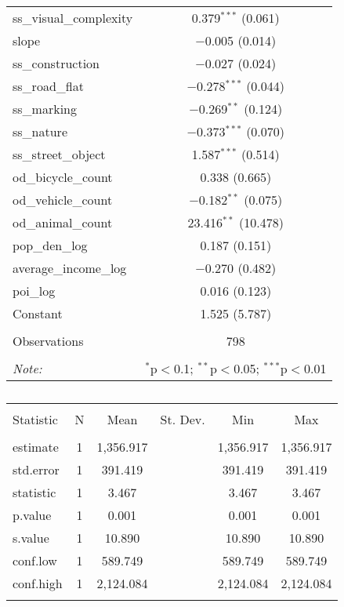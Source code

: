 \begin{table}[!htbp]
\begin{tabular}{@{\extracolsep{1pt}}lc}
  ss\_visual\_complexity & 0.379$^{***}$ (0.061) \\ 
  slope & $-$0.005 (0.014) \\ 
  ss\_construction & $-$0.027 (0.024) \\ 
  ss\_road\_flat & $-$0.278$^{***}$ (0.044) \\ 
  ss\_marking & $-$0.269$^{**}$ (0.124) \\ 
  ss\_nature & $-$0.373$^{***}$ (0.070) \\ 
  ss\_street\_object & 1.587$^{***}$ (0.514) \\ 
  od\_bicycle\_count & 0.338 (0.665) \\ 
  od\_vehicle\_count & $-$0.182$^{**}$ (0.075) \\ 
  od\_animal\_count & 23.416$^{**}$ (10.478) \\ 
  pop\_den\_log & 0.187 (0.151) \\ 
  average\_income\_log & $-$0.270 (0.482) \\ 
  poi\_log & 0.016 (0.123) \\ 
  Constant & 1.525 (5.787) \\ 
 \hline \\[-1.8ex] 
Observations & 798 \\ 
\hline 
\hline \\[-1.8ex] 
\textit{Note:}  & \multicolumn{1}{r}{$^{*}$p$<$0.1; $^{**}$p$<$0.05; $^{***}$p$<$0.01} \\ 
\end{tabular} 
\end{table} 

\begin{table}[!htbp] \centering 
  \caption{} 
  \label{} 
\small 
\begin{tabular}{@{\extracolsep{1pt}}lccccc} 
\\[-1.8ex]\hline 
\hline \\[-1.8ex] 
Statistic & \multicolumn{1}{c}{N} & \multicolumn{1}{c}{Mean} & \multicolumn{1}{c}{St. Dev.} & \multicolumn{1}{c}{Min} & \multicolumn{1}{c}{Max} \\ 
\hline \\[-1.8ex] 
estimate & 1 & 1,356.917 &  & 1,356.917 & 1,356.917 \\ 
std.error & 1 & 391.419 &  & 391.419 & 391.419 \\ 
statistic & 1 & 3.467 &  & 3.467 & 3.467 \\ 
p.value & 1 & 0.001 &  & 0.001 & 0.001 \\ 
s.value & 1 & 10.890 &  & 10.890 & 10.890 \\ 
conf.low & 1 & 589.749 &  & 589.749 & 589.749 \\ 
conf.high & 1 & 2,124.084 &  & 2,124.084 & 2,124.084 \\ 
\hline \\[-1.8ex] 
\end{tabular} 
\end{table} 

